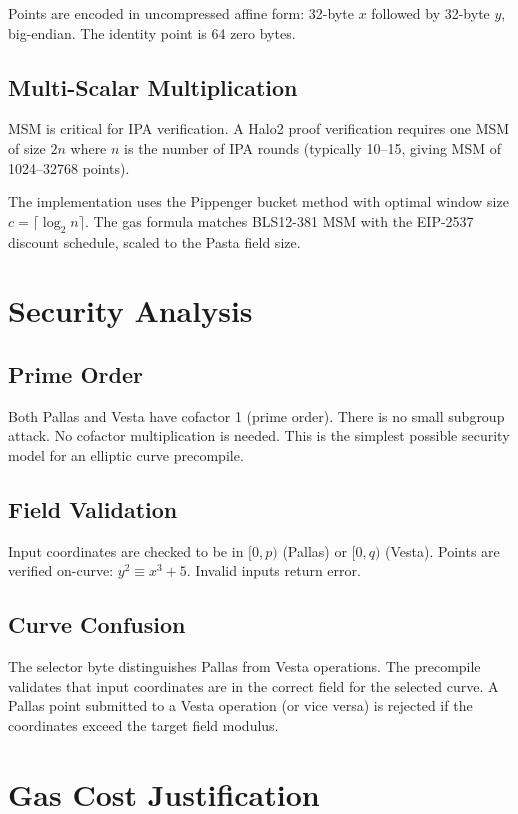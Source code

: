 \documentclass[11pt,a4paper]{article}
\begin{document}
Points are encoded in uncompressed affine form: 32-byte $x$ followed by 32-byte $y$,
big-endian. The identity point is 64 zero bytes.

\subsection{Multi-Scalar Multiplication}

MSM is critical for IPA verification. A Halo2 proof verification requires one MSM
of size $2n$ where $n$ is the number of IPA rounds (typically 10--15, giving
MSM of 1024--32768 points).

The implementation uses the Pippenger bucket method with optimal window size
$c = \lceil \log_2 n \rceil$. The gas formula matches BLS12-381 MSM with the
EIP-2537 discount schedule, scaled to the Pasta field size.

\section{Security Analysis}

\subsection{Prime Order}

Both Pallas and Vesta have cofactor 1 (prime order). There is no small subgroup
attack. No cofactor multiplication is needed. This is the simplest possible
security model for an elliptic curve precompile.

\subsection{Field Validation}

Input coordinates are checked to be in $[0, p)$ (Pallas) or $[0, q)$ (Vesta).
Points are verified on-curve: $y^2 \equiv x^3 + 5$. Invalid inputs return error.

\subsection{Curve Confusion}

The selector byte distinguishes Pallas from Vesta operations. The precompile
validates that input coordinates are in the correct field for the selected curve.
A Pallas point submitted to a Vesta operation (or vice versa) is rejected if the
coordinates exceed the target field modulus.

\section{Gas Cost Justification}
\end{document}

